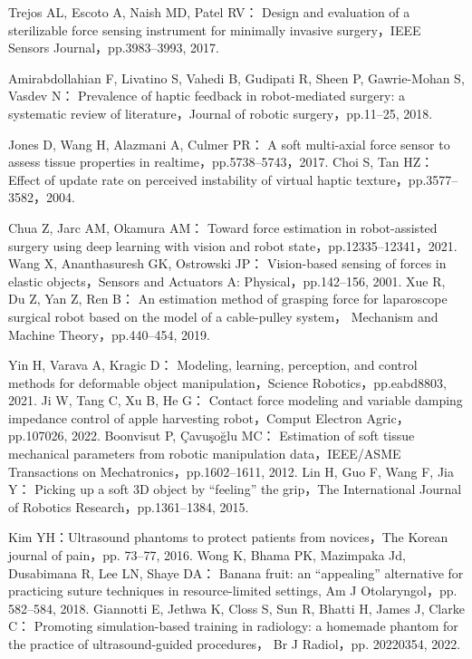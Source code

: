 \documentclass[a4paper]{jarticle}
\begin{document}
\begin{thebibliography}{9}
    Trejos AL, Escoto A, Naish MD, Patel RV：
    Design and evaluation of a sterilizable force sensing instrument for minimally invasive surgery，IEEE Sensors Journal，pp.3983–3993, 2017.

    Amirabdollahian F, Livatino S, Vahedi B, Gudipati R, Sheen P, Gawrie-Mohan S, Vasdev N：
    Prevalence of haptic feedback in robot-mediated surgery: a systematic review of literature，Journal of robotic surgery，pp.11–25, 2018.





    Jones D, Wang H, Alazmani A, Culmer PR：
    A soft multi-axial force sensor to assess tissue properties in realtime，pp.5738–5743，2017.
    Choi S, Tan HZ：
    Effect of update rate on perceived instability of virtual haptic texture，pp.3577–3582，2004.

    Chua Z, Jarc AM, Okamura AM：
    Toward force estimation in robot-assisted surgery using deep learning with vision and robot state，pp.12335–12341，2021.
    Wang X, Ananthasuresh GK, Ostrowski JP：
    Vision-based sensing of forces in elastic objects，Sensors and Actuators A: Physical，pp.142–156, 2001.
    Xue R, Du Z, Yan Z, Ren B：
    An estimation method of grasping force for laparoscope surgical robot based on the model of a cable-pulley system，
    Mechanism and Machine Theory，pp.440–454, 2019.


    Yin H, Varava A, Kragic D：
    Modeling, learning, perception, and control methods for deformable object manipulation，Science Robotics，pp.eabd8803, 2021.
    Ji W, Tang C, Xu B, He G：
    Contact force modeling and variable damping impedance control of apple harvesting robot，Comput Electron Agric，pp.107026, 2022.
    Boonvisut P, Çavuşoğlu MC：
    Estimation of soft tissue mechanical parameters from robotic manipulation data，IEEE/ASME Transactions on Mechatronics，pp.1602–1611, 2012.
    Lin H, Guo F, Wang F, Jia Y：
    Picking up a soft 3D object by “feeling” the grip，The International Journal of Robotics Research，pp.1361–1384, 2015.

    Kim YH：Ultrasound phantoms to protect patients from novices，The Korean journal of pain，pp. 73–77, 2016.
    Wong K, Bhama PK, Mazimpaka Jd, Dusabimana R, Lee LN, Shaye DA：
    Banana fruit: an “appealing” alternative for practicing suture techniques in resource-limited settings, 
    Am J Otolaryngol，pp. 582–584, 2018.
    Giannotti E, Jethwa K, Closs S, Sun R, Bhatti H, James J, Clarke C：
    Promoting simulation-based training in radiology: a homemade phantom for the practice of ultrasound-guided procedures，
    Br J Radiol，pp. 20220354, 2022.




    

\end{thebibliography}
\end{document}
